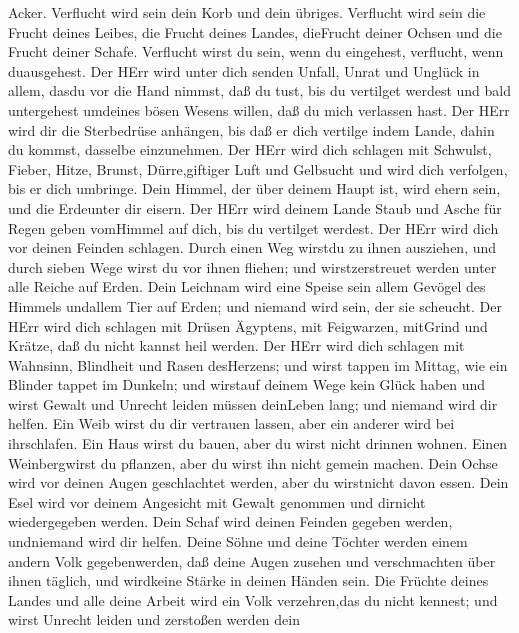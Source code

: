 Acker.  Verflucht wird sein dein Korb und dein übriges.
 Verflucht wird sein die Frucht deines Leibes, die Frucht
deines Landes, dieFrucht deiner Ochsen und die Frucht deiner Schafe.
 Verflucht wirst du sein, wenn du eingehest, verflucht,
wenn duausgehest.  Der HErr wird unter dich senden Unfall,
Unrat und Unglück in allem, dasdu vor die Hand nimmst, daß du tust, bis
du vertilget werdest und bald untergehest umdeines bösen Wesens willen,
daß du mich verlassen hast.  Der HErr wird dir die
Sterbedrüse anhängen, bis daß er dich vertilge indem Lande, dahin du
kommst, dasselbe einzunehmen.  Der HErr wird dich schlagen
mit Schwulst, Fieber, Hitze, Brunst, Dürre,giftiger Luft und Gelbsucht
und wird dich verfolgen, bis er dich umbringe.  Dein
Himmel, der über deinem Haupt ist, wird ehern sein, und die Erdeunter
dir eisern.  Der HErr wird deinem Lande Staub und Asche für
Regen geben vomHimmel auf dich, bis du vertilget werdest. 
Der HErr wird dich vor deinen Feinden schlagen. Durch einen Weg wirstdu
zu ihnen ausziehen, und durch sieben Wege wirst du vor ihnen fliehen;
und wirstzerstreuet werden unter alle Reiche auf Erden. 
Dein Leichnam wird eine Speise sein allem Gevögel des Himmels undallem
Tier auf Erden; und niemand wird sein, der sie scheucht. 
Der HErr wird dich schlagen mit Drüsen Ägyptens, mit Feigwarzen,
mitGrind und Krätze, daß du nicht kannst heil werden.  Der
HErr wird dich schlagen mit Wahnsinn, Blindheit und Rasen desHerzens;
 und wirst tappen im Mittag, wie ein Blinder tappet im
Dunkeln; und wirstauf deinem Wege kein Glück haben und wirst Gewalt und
Unrecht leiden müssen deinLeben lang; und niemand wird dir helfen.
 Ein Weib wirst du dir vertrauen lassen, aber ein anderer
wird bei ihrschlafen. Ein Haus wirst du bauen, aber du wirst nicht
drinnen wohnen. Einen Weinbergwirst du pflanzen, aber du wirst ihn nicht
gemein machen.  Dein Ochse wird vor deinen Augen
geschlachtet werden, aber du wirstnicht davon essen. Dein Esel wird vor
deinem Angesicht mit Gewalt genommen und dirnicht wiedergegeben werden.
Dein Schaf wird deinen Feinden gegeben werden, undniemand wird dir
helfen.  Deine Söhne und deine Töchter werden einem andern
Volk gegebenwerden, daß deine Augen zusehen und verschmachten über ihnen
täglich, und wirdkeine Stärke in deinen Händen sein.  Die
Früchte deines Landes und alle deine Arbeit wird ein Volk verzehren,das
du nicht kennest; und wirst Unrecht leiden und zerstoßen werden dein
